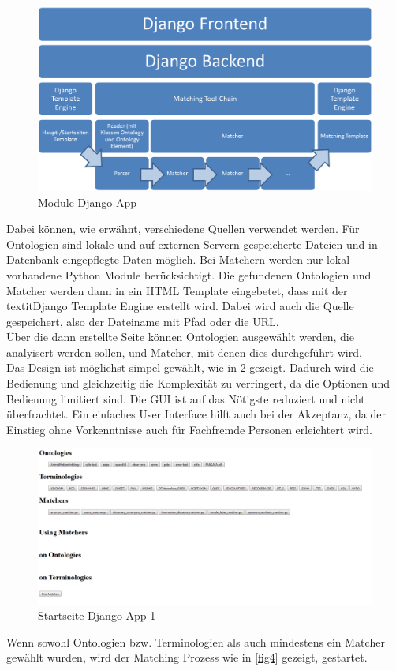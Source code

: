 		\begin{figure}[ht]
		\centering
		\includegraphics[width=1.0\textwidth]{pics/Module-overview1.png}
		\caption{Module Django App}
		\label{fig6}
		\end{figure}
		Dabei können, wie erwähnt, verschiedene Quellen verwendet werden. Für
		Ontologien sind lokale und auf externen Servern gespeicherte Dateien und in Datenbank
		eingepflegte Daten möglich. Bei Matchern werden nur lokal vorhandene Python
		Module berücksichtigt. Die gefundenen Ontologien und Matcher werden dann in
		ein HTML Template eingebetet, dass mit der textit{Django Template Engine} erstellt wird. Dabei wird auch die Quelle gespeichert, also der Dateiname mit Pfad oder
		die URL.\\
		Über die dann erstellte Seite können Ontologien ausgewählt werden, die
		analyisert werden sollen, und Matcher, mit denen dies durchgeführt wird.\\
		Das Design ist möglichst simpel gewählt, wie in \ref{fig3} gezeigt. Dadurch
		wird die Bedienung und gleichzeitig die Komplexität zu verringert, da die
		Optionen und Bedienung limitiert sind. Die GUI ist auf das Nötigste
		reduziert und nicht überfrachtet. Ein einfaches User Interface hilft auch bei
		der Akzeptanz, da der Einstieg ohne Vorkenntnisse auch für Fachfremde Personen
		erleichtert wird.
		
		\begin{figure}[ht]
		\centering
		\includegraphics[width=1.0\textwidth]{pics/TemplateMatchingStartPage.png}
		\caption{Startseite Django App 1}
		\label{fig3}
		\end{figure}
		Wenn sowohl Ontologien bzw. Terminologien als auch mindestens ein Matcher
		gewählt wurden, wird der Matching Prozess wie in \ref{fig4} gezeigt,
		gestartet.
		
